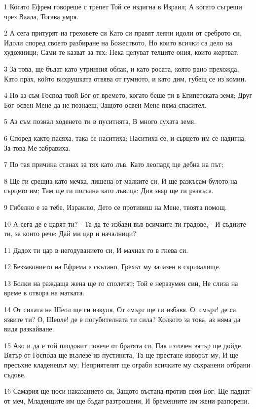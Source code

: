 \par 1 Когато Ефрем говореше с трепет Той се издигна в Израил; А когато съгреши чрез Ваала, Тогава умря.
\par 2 А сега притурят на греховете си Като си правят леяни идоли от среброто си, Идоли според своето разбиране на Божеството, Но които всички са дело на художници; Сами те казват за тях: Нека целуват телците ония, които жертват.
\par 3 За това, ще бъдат като  утринния облак, и като росата, която рано прехожда, Като прах, който вихрушката отвява от гумното, и като дим, губещ се из комин.
\par 4 Но аз съм Господ твой Бог от времето, когато беше ти в Египетската земя; Друг Бог освен Мене да не познаеш, Защото освен Мене няма спасител.
\par 5 Аз съм познал ходенето ти в пуситнята, В много сухата земя.
\par 6 Според както пасяха, така се наситиха; Наситиха се, и сьрцето им се надигна; За това Ме забравиха.
\par 7 По тая причина станах за тях като лъв, Като леопард ще дебна на път;
\par 8 Ще ги срещна като мечка, лишена от малките си, И ще разкъсам булото на сърцето им; Там ще ги погълна като лъвица; Див звяр ще ги разкъса.
\par 9 Гибелно е за тебе, Израилю, Дето се противиш на Мене, твоята помощ.
\par 10 А сега де е царят ти? - Та да те избави във всичките ти градове, - И съдиите ти, за които рече: Дай ми цар и началници?
\par 11 Дадох ти цар в негодуванието си, И махнах го в гнева си.
\par 12 Беззаконието на Ефрема е скътано, Грехът му запазен в скривалище.
\par 13 Болки на раждаща жена ще го сполетят; Той е неразумен син, Не слиза на време в отвора на матката.
\par 14 От силата на Шеол ще ги изкупя, От смърт ще ги избавя. О, смърт! де са язвите ти? О, Шеоле! де е погубителната ти сила? Колкото за това, аз няма да видя разкайване.
\par 15 Ако и да е той плодовит повече от братята си, Пак източен вятър ще дойде, Вятър от Господа ще възлезе из пустинята, Та ще престане изворът му, И ще пресъхне кладенецът му; Неприятелят ще ограби всичките му съхранени отбрани съдове.
\par 16 Самария ще носи наказанието си, Защото въстана против своя Бог; Ще паднат от меч, Младенците им ще бъдат разтрошени, И бременните им жени разпорени.

